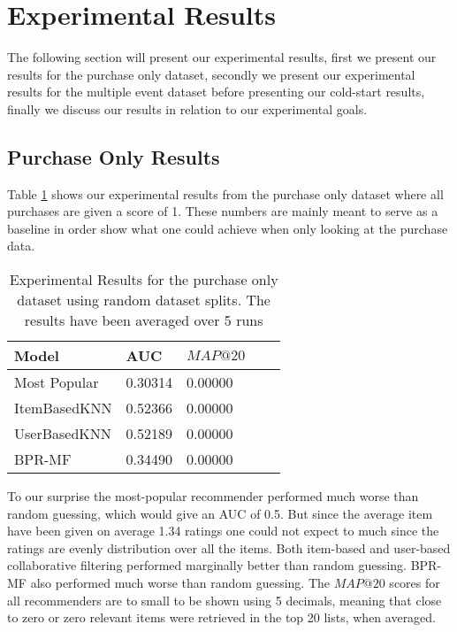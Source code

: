 
\section{Experimental Results}
\label{sec:results}

The following section will present our experimental results, first we present our results
for the purchase only dataset, secondly we present our experimental results for the multiple
event dataset before presenting our cold-start results, finally we discuss our results in
relation to our experimental goals.

\subsection{Purchase Only Results}

Table \ref{table:results-purchase-only} shows our experimental results from the purchase only dataset where all purchases
are given a score of 1. These numbers are mainly meant to serve as a baseline in order show what one
could achieve when only looking at the purchase data.

\begin{table}[H]
    \centering
    \begin{tabular}{*{5}l}
    \toprule
    Model           &   AUC         &   $MAP@20$ \\ \midrule
    \rowcolor{Gray}
    Most Popular    &   0.30314     &   0.00000 \\
    ItemBasedKNN    &   0.52366     &   0.00000 \\
    UserBasedKNN    &   0.52189     &   0.00000 \\
    BPR-MF          &   0.34490     &   0.00000 \\
    \bottomrule
    \end{tabular}
\caption[Experimental Results - Purchase Only Dataset]{Experimental Results for the purchase only dataset using random dataset splits. The results have been averaged over 5 runs}
\label{table:results-purchase-only}
\end{table}

To our surprise the most-popular recommender performed much worse than random guessing, which would give an AUC of 0.5.
But since the average item have been given on average 1.34 ratings one could not expect to much since the ratings are evenly distribution over
all the items. Both item-based and user-based collaborative filtering performed marginally better than random guessing.
BPR-MF also performed much worse than random guessing.  The $MAP@20$ scores for all recommenders are to small to be shown
using 5 decimals, meaning that close to zero or zero relevant items were retrieved in the top 20 lists, when averaged.

